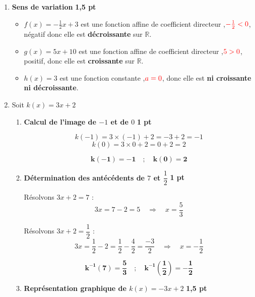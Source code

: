 \documentclass[12pt,a4paper]{article}
\begin{document}
\begin{enumerate}
    \item \textbf{Sens de variation} \hfill \textbf{1,5 pt}
    
    \begin{itemize}
        \item \( f(x) = -\frac{1}{2}x + 3 \) est une fonction affine de coefficient directeur ,$\textcolor{red}{-\frac{1}{2}<0}$, négatif  donc elle est \textbf{décroissante} sur \( \mathbb{R} \).
        \item \( g(x) = 5x + 10 \) est une fonction affine de coefficient directeur ,$\textcolor{red}{5>0}$, positif, donc elle est \textbf{croissante} sur \( \mathbb{R} \).
        \item \( h(x) = 3 \) est une fonction constante ,$\textcolor{red}{a=0}$, donc elle est \textbf{ni croissante ni décroissante}.
    \end{itemize}

    \item Soit \( k(x) = 3x + 2 \)
    \begin{enumerate}
        \item \textbf{Calcul de l’image de \(-1\) et de \(0\)} \hfill \textbf{1 pt}
        
        \[
        k(-1) = 3 \times (-1) + 2 = -3 + 2 = -1
        \]
        \[
        k(0) = 3 \times 0 + 2 = 0 + 2 = 2
        \]
        
     \begin{resultbox}
    \[
    \mathbf{k(-1) = -1 \quad ; \quad k(0) = 2}
    \]
		\end{resultbox}

        \item \textbf{Détermination des antécédents de \( 7 \) et \( \dfrac{1}{2} \)} \hfill \textbf{1 pt}

        Résolvons \( 3x + 2 = 7 \) :
        \[
        3x = 7 - 2 = 5 \quad \Rightarrow \quad x = \frac{5}{3}
        \]

        Résolvons \( 3x + 2 = \dfrac{1}{2} \) :
        \[
        3x = \frac{1}{2} - 2 = \frac{1}{2} - \frac{4}{2} = \frac{-3}{2} \quad \Rightarrow \quad x = -\frac{1}{2}
        \]

		\begin{resultbox}
    \[
    \mathbf{k^{-1}(7) = \frac{5}{3} \quad ; \quad k^{-1}\left(\frac{1}{2}\right) = -\frac{1}{2}}
    \]
		\end{resultbox}

        \item \textbf{Représentation graphique de \( k(x) = -3x + 2 \)} \hfill \textbf{1,5 pt}


\end{enumerate}
\end{enumerate}
\end{document}
